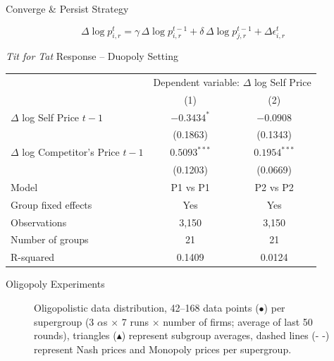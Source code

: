 \documentclass[10pt, aspectratio=169]{beamer}
\begin{document}
\begin{frame}{Converge \& Persist Strategy}
\begin{center}
\begin{tcolorbox}[colback=myorange!10, colframe=myorange, width=0.6\textwidth]
$$\Delta \log p_{i,r}^{t} = \gamma \, \Delta \log p_{i,r}^{t-1} + \delta \, \Delta \log p_{j,r}^{t-1} + \Delta \epsilon_{i,r}^t$$
\end{tcolorbox}   
\end{center}



\centering
\scriptsize %
\begin{threeparttable}
\caption{\emph{Tit for Tat} Response -- Duopoly Setting}
\begin{tabular}{lcc}
\toprule
& \multicolumn{2}{c}{Dependent variable: $\Delta$ log Self Price} \\
\cmidrule(lr){2-3}
& (1) & (2) \\
\midrule
$\Delta$ log Self Price $t-1$         & $-0.3434^{*}$ & $-0.0908$  \\
                             & (0.1863)       & (0.1343)       \\
$\Delta$ log Competitor's Price $t-1$ & $0.5093^{***}$ & $0.1954^{***}$ \\
                             & (0.1203)       & (0.0669)       \\
\midrule
Model                    & P1 vs P1       & P2 vs P2       \\          
Group fixed effects      & Yes            & Yes            \\
Observations             & 3,150          & 3,150          \\
Number of groups         & 21             & 21             \\
R-squared                & 0.1409         & 0.0124         \\
\bottomrule
\end{tabular}
\end{threeparttable}
\end{frame}


\begin{frame}{Oligopoly Experiments}
    \begin{figure}[htpb!]
        \centering
        
        \caption{Oligopolistic data distribution, 42--168 data points ($\bullet$) per supergroup (3 $\alpha$s $\times$ 7 runs $\times$ number of firms; average of last 50 rounds), triangles ($\blacktriangle$) represent subgroup averages, dashed lines ($\text{- -}$) represent Nash prices and Monopoly prices per supergroup.}
        \label{fig:oligopols}
    \end{figure}
\end{frame}
\end{document}

